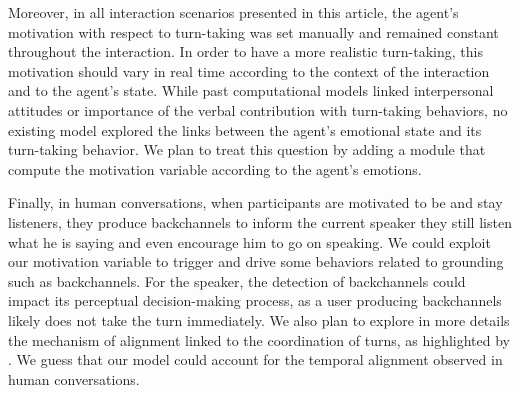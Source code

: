 Moreover, in all interaction scenarios presented in this article, the agent's motivation with respect to turn-taking was set manually and remained constant throughout the interaction. In order to have a more realistic turn-taking, this motivation should vary in real time according to the context of the interaction and to the agent's state.
While past computational models linked interpersonal attitudes \citep{ravenet_conversational_2015} or importance of the verbal contribution \citep{selfridge_bidding_2009} with turn-taking behaviors, no existing model explored the links between the agent's emotional state and its turn-taking behavior. We plan to treat this question by adding a module that compute the motivation variable according to the agent's emotions.

Finally, in human conversations, when participants are motivated to be and stay listeners, they produce backchannels to inform the current speaker they still listen what he is saying and even encourage him to go on speaking. 
We could exploit our motivation variable to trigger and drive some behaviors related to grounding such as backchannels. 
For the speaker, the detection of backchannels could impact its perceptual decision-making process, as a user producing backchannels likely does not take the turn immediately.
We also plan to explore in more details the mechanism of alignment linked to the coordination of turns, as highlighted by \citep{benus_pragmatic_2011}.
We guess that our model could account for the temporal alignment observed in human conversations.  




% 